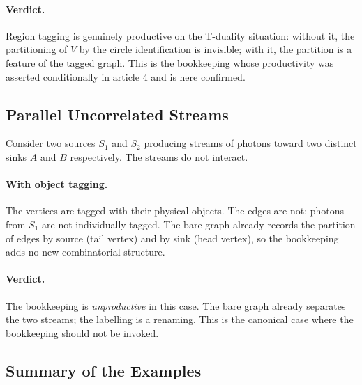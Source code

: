 \documentclass[11pt]{article}
\begin{document}
\paragraph{Verdict.} Region tagging is genuinely productive on the T-duality situation: without it, the partitioning of $V$ by the circle identification is invisible; with it, the partition is a feature of the tagged graph. This is the bookkeeping whose productivity was asserted conditionally in article 4 and is here confirmed.

\subsection{Parallel Uncorrelated Streams}

Consider two sources $S_1$ and $S_2$ producing streams of photons toward two distinct sinks $A$ and $B$ respectively. The streams do not interact.

\paragraph{With object tagging.} The vertices are tagged with their physical objects. The edges are not: photons from $S_1$ are not individually tagged. The bare graph already records the partition of edges by source (tail vertex) and by sink (head vertex), so the bookkeeping adds no new combinatorial structure.

\paragraph{Verdict.} The bookkeeping is \emph{unproductive} in this case. The bare graph already separates the two streams; the labelling is a renaming. This is the canonical case where the bookkeeping should not be invoked.

\subsection{Summary of the Examples}
\end{document}
